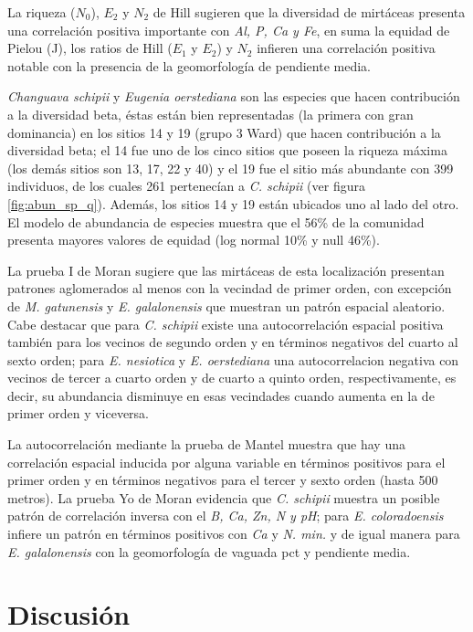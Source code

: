 \documentclass[11pt,]{article}
\begin{document}
La riqueza (\(N_0\)), \(E_2\) y \(N_2\) de Hill sugieren que la
diversidad de mirtáceas presenta una correlación positiva importante con
\emph{Al, P, Ca y Fe}, en suma la equidad de Pielou (J), los ratios de
Hill (\(E_1\) y \(E_2\)) y \(N_2\) infieren una correlación positiva
notable con la presencia de la geomorfología de pendiente media.

\emph{Changuava schipii} y \emph{Eugenia oerstediana} son las especies
que hacen contribución a la diversidad beta, éstas están bien
representadas (la primera con gran dominancia) en los sitios 14 y 19
(grupo 3 Ward) que hacen contribución a la diversidad beta; el 14 fue
uno de los cinco sitios que poseen la riqueza máxima (los demás sitios
son 13, 17, 22 y 40) y el 19 fue el sitio más abundante con 399
individuos, de los cuales 261 pertenecían a \emph{C. schipii} (ver
figura \ref{fig:abun_sp_q}). Además, los sitios 14 y 19 están ubicados
uno al lado del otro. El modelo de abundancia de especies muestra que el
56\% de la comunidad presenta mayores valores de equidad (log normal
10\% y null 46\%).

La prueba I de Moran sugiere que las mirtáceas de esta localización
presentan patrones aglomerados al menos con la vecindad de primer orden,
con excepción de \emph{M. gatunensis} y \emph{E. galalonensis} que
muestran un patrón espacial aleatorio. Cabe destacar que para \emph{C.
schipii} existe una autocorrelación espacial positiva también para los
vecinos de segundo orden y en términos negativos del cuarto al sexto
orden; para \emph{E. nesiotica} y \emph{E. oerstediana} una
autocorrelacion negativa con vecinos de tercer a cuarto orden y de
cuarto a quinto orden, respectivamente, es decir, su abundancia
disminuye en esas vecindades cuando aumenta en la de primer orden y
viceversa.

La autocorrelación mediante la prueba de Mantel muestra que hay una
correlación espacial inducida por alguna variable en términos positivos
para el primer orden y en términos negativos para el tercer y sexto
orden (hasta 500 metros). La prueba Yo de Moran evidencia que \emph{C.
schipii} muestra un posible patrón de correlación inversa con el
\emph{B, Ca, Zn, N y pH}; para \emph{E. coloradoensis} infiere un patrón
en términos positivos con \emph{Ca} y \emph{N. min.} y de igual manera
para \emph{E. galalonensis} con la geomorfología de vaguada pct y
pendiente media.

\section{Discusión}\label{discusiuxf3n}
\end{document}
